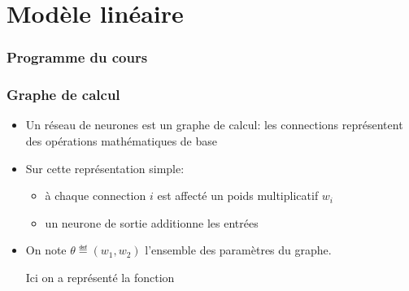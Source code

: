 \documentclass[9pt,table]{beamer} %
\begin{document}
\section{Modèle linéaire}

\begin{frame}
\frametitle{Programme du cours}
\tableofcontents[currentsection]
\end{frame}



\begin{frame}
\frametitle{Graphe de calcul}

\begin{itemize}[label=\tiny$\blacksquare$]
	\item Un réseau de neurones est un \alert{graphe de calcul}: les connections représentent des opérations mathématiques de base
\end{itemize}

\begin{center}
\end{center}

\begin{itemize}[label=\tiny$\blacksquare$]
	\item Sur cette représentation simple:
	\begin{itemize}[label=-]
		\item à chaque \alert{connection} ${i}$ est affecté un \alert{poids} multiplicatif $w_i$
		\item un neurone de sortie \alert{additionne} les entrées
	\end{itemize}
	
	\pause
	
	\item On note \alert{$\theta \eqdef (w_1,w_2)$} l'ensemble des paramètres du graphe. 
	
	Ici on a représenté la fonction
\end{itemize}


\end{frame}
\end{document}
